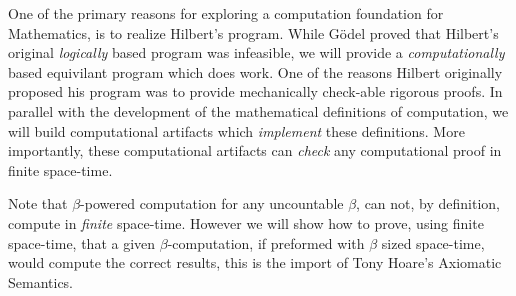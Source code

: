 One of the primary reasons for exploring a computation foundation for
Mathematics, is to realize Hilbert's program. While G\"odel proved that
Hilbert's original \emph{logically} based program was infeasible, we will
provide a \emph{computationally} based equivilant program which does work. One
of the reasons Hilbert originally proposed his program was to provide
mechanically check-able rigorous proofs. In parallel with the development of the
mathematical definitions of computation, we will build computational artifacts
which \emph{implement} these definitions. More importantly, these computational
artifacts can \emph{check} any computational proof in finite space-time.

Note that $\beta$-powered computation for any uncountable $\beta$, can not, by
definition, compute in \emph{finite} space-time. However we will show how to
prove, using finite space-time, that a given $\beta$-computation, if preformed
with $\beta$ sized space-time, would compute the correct results, this is the
import of Tony Hoare's Axiomatic Semantics.

